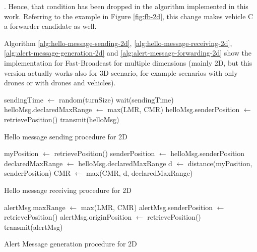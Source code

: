 		. Hence, that condition has been dropped in the algorithm implemented in this work. Referring to the example in Figure \ref{fig:fb-2d}, this change makes vehicle C a forwarder candidate as well.
		
		Algorithm \ref{alg:hello-message-sending-2d}, \ref{alg:hello-message-receiving-2d}, \ref{alg:alert-message-generation-2d} and \ref{alg:alert-message-forwarding-2d} show the implementation for Fast-Broadcast for multiple dimensions (mainly 2D, but this version actually works also for 3D scenario, for example scenarios with only drones or with drones and vehicles).
		
		\begin{algorithm}[H]
			\begin{algorithmic}[1]
				\State sendingTime $\gets$ random(turnSize)
				\State wait(sendingTime)
				\State helloMsg.declaredMaxRange $\gets$ max(LMR, CMR)
				\State helloMsg.senderPosition $\gets$ retrievePosition()
				\State transmit(helloMsg)
				\EndIf
				\EndFor
			\end{algorithmic}
			\caption{Hello message sending procedure for 2D}
			\label{alg:hello-message-sending-2d}
		\end{algorithm}
		
		\begin{algorithm}[H]
			\begin{algorithmic}[1]
				\State myPosition $\gets$ retrievePosition()
				\State senderPosition $\gets$ helloMsg.senderPosition
				\State declaredMaxRange $\gets$ helloMsg.declaredMaxRange
				\State d $\gets$ distance(myPosition, senderPosition)
				\State CMR $\gets$ max(CMR, d, declaredMaxRange)
			\end{algorithmic}
			\caption{Hello message receiving procedure for 2D}
			\label{alg:hello-message-receiving-2d}
		\end{algorithm}
	
	
		\begin{algorithm}[H]
			\begin{algorithmic}[1]
				\State alertMsg.maxRange $\gets$ max(LMR, CMR)
				\State alertMsg.senderPosition $\gets$ retrievePosition()
				\State alertMsg.originPosition $\gets$ retrievePosition()
				\State transmit(alertMsg)
			\end{algorithmic}
			\caption{Alert Message generation procedure for 2D}
			\label{alg:alert-message-generation-2d}
		\end{algorithm}
	

